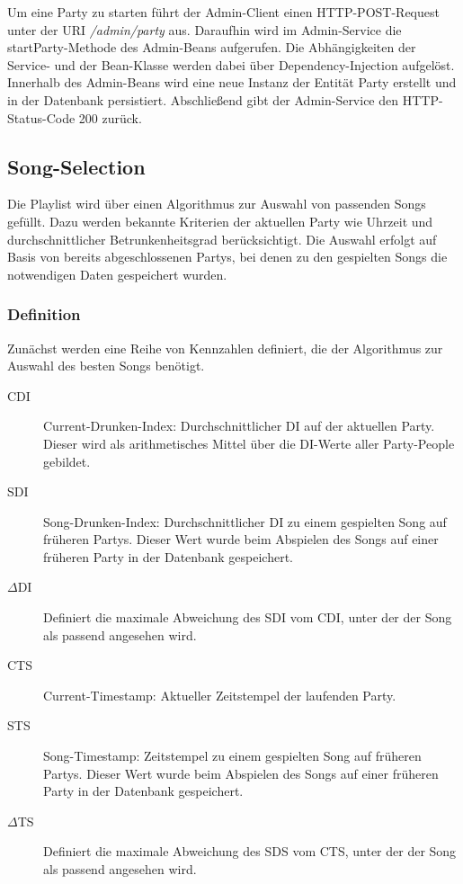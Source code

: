 Um eine Party zu starten führt der Admin-Client einen HTTP-POST-Request unter der URI \textit{/admin/party} aus. Daraufhin wird im Admin-Service die startParty-Methode des Admin-Beans aufgerufen. Die Abhängigkeiten der Service- und der Bean-Klasse werden dabei über Dependency-Injection aufgelöst. Innerhalb des Admin-Beans wird eine neue Instanz der Entität Party erstellt und in der Datenbank persistiert. Abschließend gibt der Admin-Service den HTTP-Status-Code 200 zurück.

\subsection{Song-Selection}
\label{sec:SongSelect}
Die Playlist wird über einen Algorithmus zur Auswahl von passenden Songs gefüllt. Dazu werden bekannte Kriterien der aktuellen Party wie Uhrzeit und durchschnittlicher Betrunkenheitsgrad berücksichtigt. Die Auswahl erfolgt auf Basis von bereits abgeschlossenen Partys, bei denen zu den gespielten Songs die notwendigen Daten gespeichert wurden.

\subsubsection{Definition}
Zunächst werden eine Reihe von Kennzahlen definiert, die der Algorithmus zur Auswahl des besten Songs benötigt.

\begin{description}
	\item[CDI] Current-Drunken-Index: Durchschnittlicher DI auf der aktuellen Party. Dieser wird als arithmetisches Mittel über die DI-Werte aller Party-People gebildet.
	\item[SDI] Song-Drunken-Index: Durchschnittlicher DI zu einem gespielten Song auf früheren Partys. Dieser Wert wurde beim Abspielen des Songs auf einer früheren Party in der Datenbank gespeichert.
	\item[$\Delta$DI] Definiert die maximale Abweichung des SDI vom CDI, unter der der Song als passend angesehen wird.
	\item[CTS] Current-Timestamp: Aktueller Zeitstempel der laufenden Party.
	\item[STS] Song-Timestamp: Zeitstempel zu einem gespielten Song auf früheren Partys. Dieser Wert wurde beim Abspielen des Songs auf einer früheren Party in der Datenbank gespeichert.
	\item[$\Delta$TS] Definiert die maximale Abweichung des SDS vom CTS, unter der der Song als passend angesehen wird.
\end{description}

